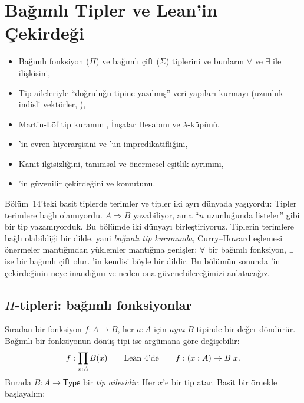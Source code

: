 \chapter{Bağımlı Tipler ve Lean'in Çekirdeği}\label{bol:bagimli}

\begin{bolumhedefleri}
\begin{itemize}
  \item Bağımlı fonksiyon ($Π$) ve bağımlı çift ($Σ$) tiplerini ve bunların
        $\forall$ ve $\exists$ ile ilişkisini,
  \item Tip aileleriyle ``doğruluğu tipine yazılmış'' veri yapıları kurmayı
        (uzunluk indisli vektörler, ),
  \item Martin-Löf tip kuramını, İnşalar Hesabını ve $\lambda$-küpünü,
  \item \Lean{}'in evren hiyerarşisini ve 'un impredikatifliğini,
  \item Kanıt-ilgisizliğini, tanımsal ve önermesel eşitlik ayrımını,
  \item \Lean{}'in güvenilir çekirdeğini ve  
        komutunu.
\end{itemize}
\end{bolumhedefleri}

Bölüm~14'teki basit tiplerde terimler ve tipler iki ayrı dünyada
yaşıyordu: Tipler terimlere bağlı olamıyordu. $A \Rightarrow B$ yazabiliyor,
ama ``$n$ uzunluğunda listeler'' gibi bir tip yazamıyorduk. Bu bölümde iki
dünyayı birleştiriyoruz. Tiplerin terimlere bağlı olabildiği bir dilde,
yani \emph{bağımlı tip kuramında}, Curry--Howard eşlemesi önermeler
mantığından yüklemler mantığına genişler: $\forall$ bir bağımlı fonksiyon,
$\exists$ ise bir bağımlı çift olur. \Lean{}'in kendisi böyle bir dildir.
Bu bölümün sonunda \Lean{}'in çekirdeğinin neye inandığını ve neden ona
güvenebileceğimizi anlatacağız.

\section{$Π$-tipleri: bağımlı fonksiyonlar}\label{sec:pi}

Sıradan bir fonksiyon $f : A \to B$, her $a : A$ için \emph{aynı} $B$
tipinde bir değer döndürür. Bağımlı bir fonksiyonun dönüş tipi ise
argümana göre değişebilir:
\[
  f : \prod_{x : A} B(x)
  \qquad\text{Lean~4{}'de}\qquad
  f : (x : A) \to B\;x .
\]
Burada $B : A \to \mathsf{Type}$ bir \emph{tip ailesidir}: Her $x$'e bir
tip atar. Basit bir örnekle başlayalım:

